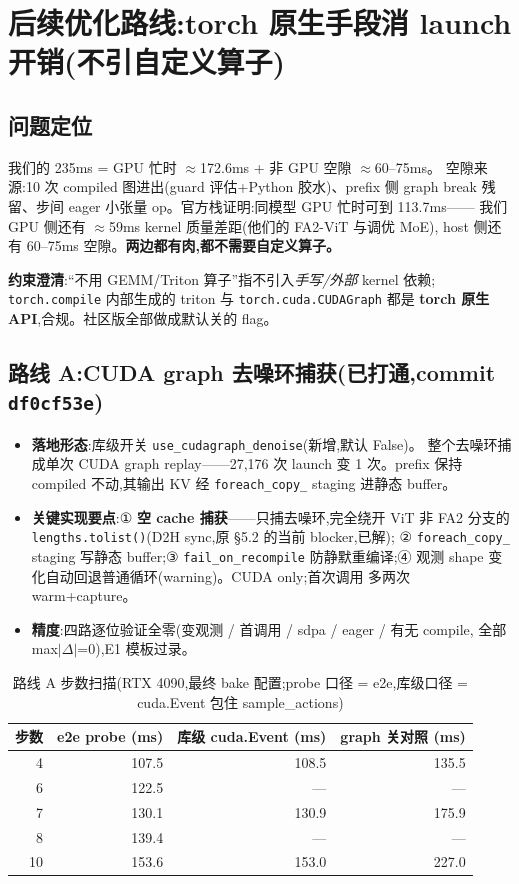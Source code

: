 \documentclass[11pt]{ctexart}
\begin{document}
\section{后续优化路线:torch 原生手段消 launch 开销(不引自定义算子)}

\subsection{问题定位}
我们的 235ms = GPU 忙时 $\approx$172.6ms + 非 GPU 空隙 $\approx$60--75ms。
空隙来源:10 次 compiled 图进出(guard 评估+Python 胶水)、prefix 侧 graph break
残留、步间 eager 小张量 op。官方栈证明:同模型 GPU 忙时可到 113.7ms——
我们 GPU 侧还有 $\approx$59ms kernel 质量差距(他们的 FA2-ViT 与调优 MoE),
host 侧还有 60--75ms 空隙。\textbf{两边都有肉,都不需要自定义算子。}

\textbf{约束澄清}:``不用 GEMM/Triton 算子''指不引入\textit{手写/外部} kernel 依赖;
\texttt{torch.compile} 内部生成的 triton 与 \texttt{torch.cuda.CUDAGraph} 都是
\textbf{torch 原生 API},合规。社区版全部做成默认关的 flag。

\subsection{路线 A:CUDA graph 去噪环捕获(\textbf{已打通},commit \texttt{df0cf53e})}
\begin{itemize}
\item \textbf{落地形态}:库级开关 \texttt{use\_cudagraph\_denoise}(新增,默认 False)。
整个去噪环捕成单次 CUDA graph replay——27,176 次 launch 变 1 次。prefix 保持
compiled 不动,其输出 KV 经 \texttt{foreach\_copy\_} staging 进静态 buffer。
\item \textbf{关键实现要点}:① \textbf{空 cache 捕获}——只捕去噪环,完全绕开 ViT
非 FA2 分支的 \texttt{lengths.tolist()}(D2H sync,原 §5.2 的当前 blocker,已解);
② \texttt{foreach\_copy\_} staging 写静态 buffer;③ \texttt{fail\_on\_recompile}
防静默重编译;④ 观测 shape 变化自动回退普通循环(warning)。CUDA only;首次调用
多两次 warm+capture。
\item \textbf{精度}:四路逐位验证全零(变观测 / 首调用 / sdpa / eager / 有无 compile,
全部 max$|\Delta|$=0),E1 模板过录。
\end{itemize}

\begin{table}[htbp]
\centering\small
\caption{路线 A 步数扫描(RT$\!$X 4090,最终 bake 配置;probe 口径 = e2e,库级口径 = cuda.Event 包住 sample\_actions)}
\begin{tabular}{@{}rrrr@{}}
\toprule
步数 & e2e probe (ms) & 库级 cuda.Event (ms) & graph 关对照 (ms) \\
\midrule
4 & 107.5 & 108.5 & 135.5 \\
6 & 122.5 & --- & --- \\
7 & 130.1 & 130.9 & 175.9 \\
8 & 139.4 & --- & --- \\
10 & 153.6 & 153.0 & 227.0 \\
\bottomrule
\end{tabular}
\end{table}
\end{document}
